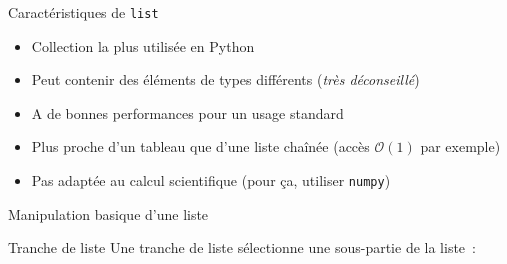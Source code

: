 \begin{frame}{Caractéristiques de \texttt{list}}
  \begin{itemize}
    \item Collection la plus utilisée en Python
    \item Peut contenir des éléments de types différents (\emph{très déconseillé})
    \item A de bonnes performances pour un usage standard
    \item Plus proche d'un tableau que d'une liste chaînée (accès $\mathcal{O}(1)$ par exemple)
    \item Pas adaptée au calcul scientifique (pour ça, utiliser \texttt{numpy})
  \end{itemize}
\end{frame}

\begin{frame}{Manipulation basique d'une liste}
\end{frame}

\begin{frame}{Tranche de liste}
  Une tranche de liste sélectionne une sous-partie de la liste~:
\end{frame}
